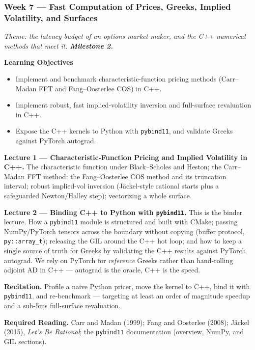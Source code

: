\documentclass[
]{article}
\providecommand{\tightlist}{%
  \setlength{\itemsep}{0pt}\setlength{\parskip}{0pt}}
\begin{document}
\subsubsection{Week 7 --- Fast Computation of Prices, Greeks, Implied
Volatility, and
Surfaces}\label{week-7-fast-computation-of-prices-greeks-implied-volatility-and-surfaces}

\emph{Theme: the latency budget of an options market maker, and the C++
numerical methods that meet it. \textbf{Milestone 2.}}

\textbf{Learning Objectives}

\begin{itemize}
\tightlist
\item
  Implement and benchmark characteristic-function pricing methods
  (Carr--Madan FFT and Fang--Oosterlee COS) in C++.
\item
  Implement robust, fast implied-volatility inversion and full-surface
  revaluation in C++.
\item
  Expose the C++ kernels to Python with \texttt{pybind11}, and validate
  Greeks against PyTorch autograd.
\end{itemize}

\textbf{Lecture 1 --- Characteristic-Function Pricing and Implied
Volatility in C++.} The characteristic function under Black--Scholes and
Heston; the Carr--Madan FFT method; the Fang--Oosterlee COS method and
its truncation interval; robust implied-vol inversion (Jäckel-style
rational starts plus a safeguarded Newton/Halley step); vectorizing a
whole surface.

\textbf{Lecture 2 --- Binding C++ to Python with \texttt{pybind11}.}
This is the binder lecture. How a \texttt{pybind11} module is structured
and built with CMake; passing NumPy/PyTorch tensors across the boundary
without copying (buffer protocol, \texttt{py::array\_t}); releasing the
GIL around the C++ hot loop; and how to keep a single source of truth
for Greeks by validating the C++ results against PyTorch autograd. We
rely on PyTorch for \emph{reference} Greeks rather than hand-rolling
adjoint AD in C++ --- autograd is the oracle, C++ is the speed.

\textbf{Recitation.} Profile a naive Python pricer, move the kernel to
C++, bind it with \texttt{pybind11}, and re-benchmark --- targeting at
least an order of magnitude speedup and a sub-5ms full-surface
revaluation.

\textbf{Required Reading.} Carr and Madan (1999); Fang and Oosterlee
(2008); Jäckel (2015), \emph{Let's Be Rational}; the \texttt{pybind11}
documentation (overview, NumPy, and GIL sections).
\end{document}
